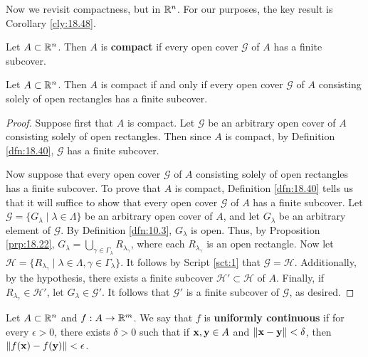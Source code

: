\documentclass[../main.tex]{subfiles}
\begin{document}
Now we revisit compactness, but in $\mathbb{R}^n$. For our purposes, the key result is Corollary \ref{cly:18.48}.

\begin{definition}\label{dfn:18.40}
    Let $A\subset\mathbb{R}^n$. Then $A$ is \textbf{compact} if every open cover $\mathcal{G}$ of $A$ has a finite subcover.
\end{definition}

\begin{proposition}\label{prp:18.41}
    Let $A\subset\mathbb{R}^n$. Then $A$ is compact if and only if every open cover $\mathcal{G}$ of $A$ consisting solely of open rectangles has a finite subcover.
    \begin{proof}
        Suppose first that $A$ is compact. Let $\mathcal{G}$ be an arbitrary open cover of $A$ consisting solely of open rectangles. Then since $A$ is compact, by Definition \ref{dfn:18.40}, $\mathcal{G}$ has a finite subcover.\par
        Now suppose that every open cover $\mathcal{G}$ of $A$ consisting solely of open rectangles has a finite subcover. To prove that $A$ is compact, Definition \ref{dfn:18.40} tells us that it will suffice to show that every open cover $\mathcal{G}$ of $A$ has a finite subcover. Let $\mathcal{G}=\{G_\lambda\mid\lambda\in\Lambda\}$ be an arbitrary open cover of $A$, and let $G_\lambda$ be an arbitrary element of $\mathcal{G}$. By Definition \ref{dfn:10.3}, $G_\lambda$ is open. Thus, by Proposition \ref{prp:18.22}, $G_\lambda=\bigcup_{\gamma\in\Gamma_\lambda}R_{\lambda_\gamma}$, where each $R_{\lambda_\gamma}$ is an open rectangle. Now let $\mathcal{H}=\{R_{\lambda_\gamma}\mid\lambda\in\Lambda,\gamma\in\Gamma_\lambda\}$. It follows by Script \ref{sct:1} that $\mathcal{G}=\mathcal{H}$. Additionally, by the hypothesis, there exists a finite subcover $\mathcal{H}'\subset\mathcal{H}$ of $A$. Finally, if $R_{\lambda_\gamma}\in\mathcal{H}'$, let $G_\lambda\in\mathcal{G}'$. It follows that $\mathcal{G}'$ is a finite subcover of $\mathcal{G}$, as desired.
    \end{proof}
\end{proposition}

\begin{definition}\label{dfn:18.42}
    Let $A\subset\mathbb{R}^n$ and $f:A\to\mathbb{R}^m$. We say that $f$ is \textbf{uniformly continuous} if for every $\epsilon>0$, there exists $\delta>0$ such that if $\mathbf{x},\mathbf{y}\in A$ and $\norm{\mathbf{x}-\mathbf{y}}<\delta$, then $\norm{f(\mathbf{x})-f(\mathbf{y})}<\epsilon$.
\end{definition}
\end{document}
